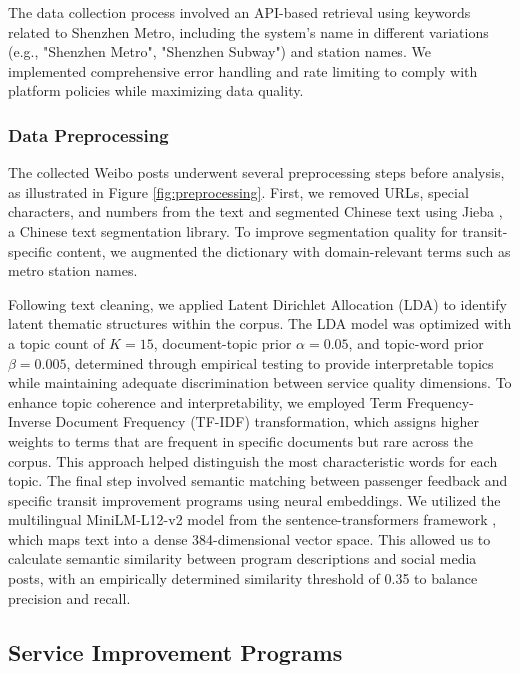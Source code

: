 \documentclass[a4paper,fleqn,12pt]{cas-sc}
\begin{document}
The data collection process involved an API-based retrieval using keywords related to Shenzhen Metro, including the system's name in different variations (e.g., "Shenzhen Metro", "Shenzhen Subway") and station names. We implemented comprehensive error handling and rate limiting to comply with platform policies while maximizing data quality.

\subsubsection{Data Preprocessing}

The collected Weibo posts underwent several preprocessing steps before analysis, as illustrated in Figure \ref{fig:preprocessing}. First, we removed URLs, special characters, and numbers from the text and segmented Chinese text using Jieba \citep{sun2012jieba}, a Chinese text segmentation library. To improve segmentation quality for transit-specific content, we augmented the dictionary with domain-relevant terms such as metro station names.

Following text cleaning, we applied Latent Dirichlet Allocation (LDA) to identify latent thematic structures within the corpus. The LDA model was optimized with a topic count of $K = 15$, document-topic prior $\alpha = 0.05$, and topic-word prior $\beta = 0.005$, determined through empirical testing to provide interpretable topics while maintaining adequate discrimination between service quality dimensions. To enhance topic coherence and interpretability, we employed Term Frequency-Inverse Document Frequency (TF-IDF) transformation, which assigns higher weights to terms that are frequent in specific documents but rare across the corpus. This approach helped distinguish the most characteristic words for each topic. The final step involved semantic matching between passenger feedback and specific transit improvement programs using neural embeddings. We utilized the multilingual MiniLM-L12-v2 model from the sentence-transformers framework \citep{reimers2019sentence}, which maps text into a dense 384-dimensional vector space. This allowed us to calculate semantic similarity between program descriptions and social media posts, with an empirically determined similarity threshold of 0.35 to balance precision and recall.

\subsection{Service Improvement Programs}
\end{document}
